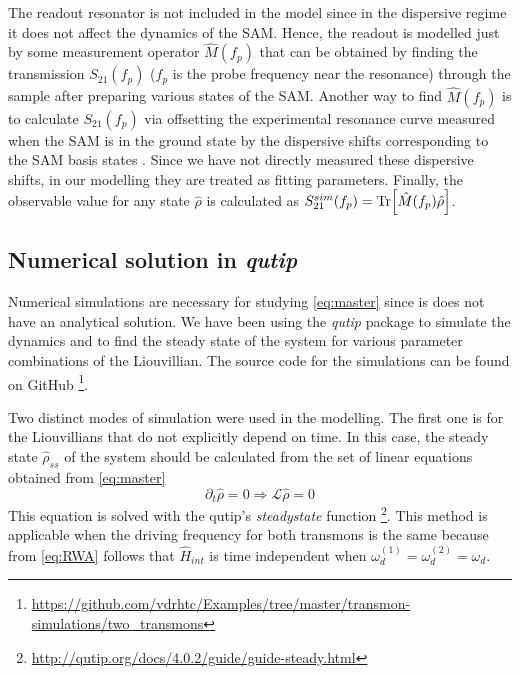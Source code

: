 \documentclass[%
 aps, prx,
 amsmath,amssymb,
 reprint,%
superscriptaddress
]{revtex4-2}
\begin{document}
The readout resonator is not included in the 
model since in the dispersive regime it does not 
affect the dynamics of the SAM. Hence, the 
readout is modelled just by some measurement 
operator $\hat M(f_p)$ that can be obtained by 
finding the transmission $S_{21}(f_p)$ ($f_p$ is 
the probe frequency near the resonance) through 
the sample after preparing various states of the 
SAM. Another way to find $\hat M(f_p)$ is to 
calculate $S_{21}(f_p)$ via offsetting the 
experimental resonance curve measured when the 
SAM is in the ground state by the dispersive 
shifts corresponding to the SAM basis 
states \cite{filipp2009two, chow2010detecting}. Since we have not 
directly measured these dispersive shifts, in our 
modelling they are treated as fitting parameters. 
Finally, the observable value for any state $\hat 
\rho$ is calculated as $S_{21}^{sim}(f_p) = 
\Tr[\hat M(f_p) \hat \rho]$.


\subsection{Numerical solution in \textit{qutip}}


Numerical simulations are necessary for studying 
\autoref{eq:master} since is does not have an 
analytical solution. We have been using the 
\textit{qutip} \cite{johansson2013qutip} package to simulate the 
dynamics and to find the steady state of the 
system for various parameter combinations of the 
Liouvillian. The source code for the simulations can be found on GitHub \footnote{\url{https://github.com/vdrhtc/Examples/tree/master/transmon-simulations/two_transmons}}. 

Two distinct modes of simulation were used in the 
modelling. The first one is for the Liouvillians 
that do not explicitly depend on time. In this 
case, the steady state $\hat \rho_{ss}$ of the 
system should be calculated from the set of 
linear equations obtained from \autoref{eq:master}
\begin{equation}
\partial_t \hat \rho = 0  \Rightarrow \mathcal{L} 
\hat \rho = 0
\label{eq:steady}
\end{equation}
This equation is solved with the qutip's 
\textit{steadystate} 
function \footnote{\url{http://qutip.org/docs/4.0.2/guide/guide-steady.html}}.
 This method is applicable when the driving 
frequency for both transmons is the same because 
from \autoref{eq:RWA} follows that $\hat H_{int}$ 
is time independent when $\omega_d^{(1)} = 
\omega_d^{(2)} = 
\omega_d$.
\end{document}
